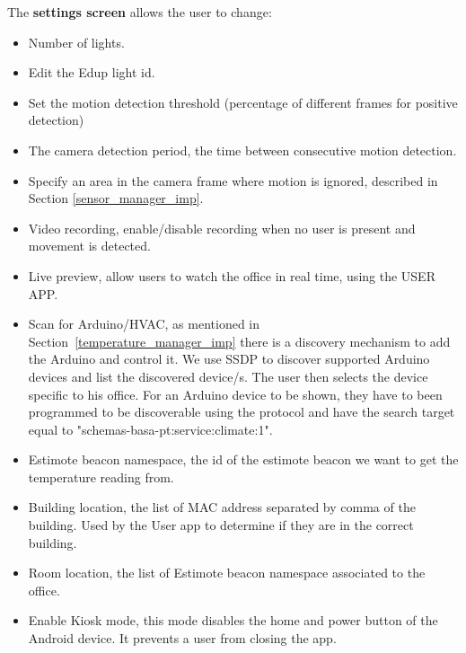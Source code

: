 The \textbf{settings screen} allows the user to change:
\begin{itemize}
  \item Number of lights.
  \item Edit the Edup light id.
  
  \item Set the motion detection threshold (percentage of different frames for positive detection)
  
  \item The camera detection period, the time between consecutive motion detection.
  
  \item Specify an area in the camera frame where motion is ignored, described in Section \ref{sensor_manager_imp}. 
  
  \item Video recording, enable/disable recording when no user is present and movement is detected.
  
  \item Live preview, allow users to watch the office in real time, using the USER APP.
  
  \item Scan for Arduino/HVAC, as mentioned in Section~\ref{temperature_manager_imp} there is a discovery mechanism to add the Arduino and control it. We use \ac{SSDP} to discover supported Arduino devices and list the discovered device/s. The user then selects the device specific to his office.
  For an Arduino device to be shown, they have to been programmed to be discoverable using the protocol and have the search target equal to "schemas-basa-pt:service:climate:1".
  
  \item Estimote beacon namespace, the id of the estimote beacon we want to get the temperature reading from.
  
  \item Building location, the list of \ac{MAC} address separated by comma of the building. Used by the User app to determine if they are in the correct building.
  
  \item Room location, the list of Estimote beacon namespace associated to the office.
  
  
  \item Enable Kiosk mode, this mode disables the home and power button of the Android device. It prevents a user from closing the app. 
    
  
\end{itemize}

